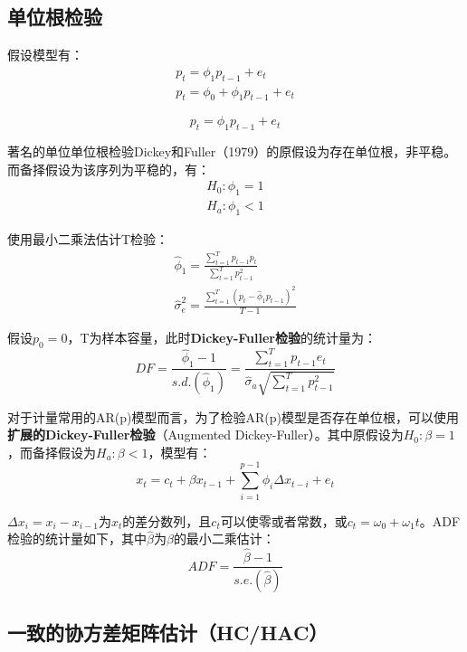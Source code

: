 \documentclass[11pt]{article}
\begin{document}
\subsection{单位根检验}

假设模型有：
\begin{gather*}
    p_t = \phi_1 p_{t-1} + e_t \\
    p_t = \phi_0 + \phi_1 p_{t-1} + e_t
\end{gather*}

\begin{equation*}
    p_t = \phi_1 p_{t-1} + e_t
\end{equation*}

著名的单位单位根检验Dickey和Fuller（1979）的原假设为存在单位根，非平稳。而备择假设为该序列为平稳的，有：
\begin{gather*}
    H_0: \phi_1 = 1 \\
    H_a: \phi_1 < 1
\end{gather*}

使用最小二乘法估计T检验：
\begin{gather*}
    \hat{\phi}_1 = \frac{\sum_{t=1}^{T} p_{t-1}p_t}{\sum_{t=1}^{T} p_{t-1}^{2}} \\
    \hat{\sigma}_{e}^{2} = \frac{\sum_{t=1}^{T} \left(p_t - \hat{\phi}_1 p_{t-1} \right)^2}{T-1}
\end{gather*}

假设$p_0=0$，T为样本容量，此时\textbf{Dickey-Fuller检验}的统计量为：
\begin{equation*}
    DF = \frac{\hat{\phi}_1 - 1}{s.d.(\hat{\phi}_1)}
    = \frac{\sum_{t=1}^{T} p_{t-1} e_t}{\hat{\sigma}_{a} \sqrt{\sum_{t=1}^{T} p_{t-1}^{2}}} 
\end{equation*}

对于计量常用的AR(p)模型而言，为了检验AR(p)模型是否存在单位根，可以使用\textbf{扩展的Dickey-Fuller检验}（Augmented Dickey-Fuller）。其中原假设为$H_0: \beta=1$，而备择假设为$H_a: \beta<1$，模型有：
\begin{equation*}
    x_t = c_t + \beta x_{t-1} + \sum_{i=1}^{p-1}\phi_i \Delta x_{t-i} + e_t
\end{equation*}

$\Delta x_{i}= x_i -x_{i-1}$为$x_t$的差分数列，且$c_t$可以使零或者常数，或$c_t=\omega_0 + \omega_1 t$。ADF检验的统计量如下，其中$\hat{\beta}$为$\beta$的最小二乘估计：
\begin{equation*}
    ADF = \frac{\hat{\beta}-1}{s.e.(\hat{\beta})}
\end{equation*}

\subsection{一致的协方差矩阵估计（HC/HAC）}
\end{document}
